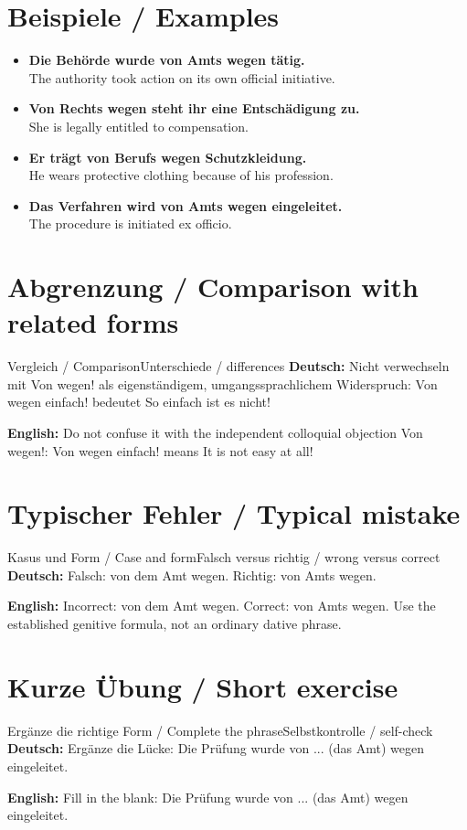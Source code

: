 \documentclass[a4paper,11pt]{article}
\newcommand{\GermanText}[1]{\textbf{Deutsch: }#1\par}
\newcommand{\EnglishText}[1]{{\small\color{SoftGray}\textbf{English: }#1\par}}
\newcommand{\ExampleItem}[2]{\item \textbf{#1}\\{\small\color{SoftGray}#2}}
\begin{document}
\section{Beispiele / Examples}
\begin{exbox}
\begin{itemize}
\ExampleItem{Die Behörde wurde von Amts wegen tätig.}{The authority took action on its own official initiative.}
\ExampleItem{Von Rechts wegen steht ihr eine Entschädigung zu.}{She is legally entitled to compensation.}
\ExampleItem{Er trägt von Berufs wegen Schutzkleidung.}{He wears protective clothing because of his profession.}
\ExampleItem{Das Verfahren wird von Amts wegen eingeleitet.}{The procedure is initiated ex officio.}
\end{itemize}
\end{exbox}
\section{Abgrenzung / Comparison with related forms}
\begin{grammarentry}{Vergleich / Comparison}{Unterschiede / differences}
\GermanText{Nicht verwechseln mit Von wegen! als eigenständigem, umgangssprachlichem Widerspruch: Von wegen einfach! bedeutet So einfach ist es nicht!}
\EnglishText{Do not confuse it with the independent colloquial objection Von wegen!: Von wegen einfach! means It is not easy at all!}
\end{grammarentry}
\section{Typischer Fehler / Typical mistake}
\begin{grammarentry}{Kasus und Form / Case and form}{Falsch versus richtig / wrong versus correct}
\GermanText{Falsch: von dem Amt wegen. Richtig: von Amts wegen.}
\EnglishText{Incorrect: von dem Amt wegen. Correct: von Amts wegen. Use the established genitive formula, not an ordinary dative phrase.}
\end{grammarentry}
\section{Kurze Übung / Short exercise}
\begin{grammarentry}{Ergänze die richtige Form / Complete the phrase}{Selbstkontrolle / self-check}
\GermanText{Ergänze die Lücke: Die Prüfung wurde von ... (das Amt) wegen eingeleitet.}
\EnglishText{Fill in the blank: Die Prüfung wurde von ... (das Amt) wegen eingeleitet.}
\end{grammarentry}
\end{document}
